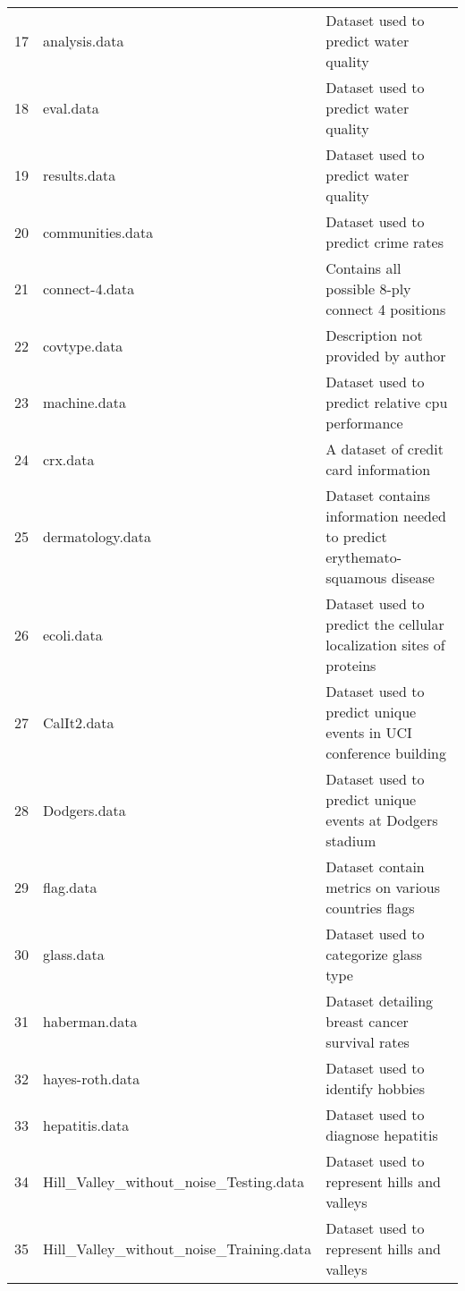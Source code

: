 \begin{table}
{\begin{tabular}{lll}
17 &                            analysis.data &  Dataset used to predict water quality\\
18 &                                eval.data &  Dataset used to predict water quality\\
19 &                             results.data &  Dataset used to predict water quality\\
20 &                         communities.data &  Dataset used to predict crime rates\\
21 &                           connect-4.data &  Contains all possible 8-ply connect 4 positions\\
22 &                             covtype.data &  Description not provided by author\\
23 &                             machine.data &  Dataset used to predict relative cpu performance\\
24 &                                 crx.data &  A dataset of credit card information\\
25 &                         dermatology.data &  Dataset contains information needed to predict erythemato-squamous disease\\
26 &                               ecoli.data &  Dataset used to predict the cellular localization sites of proteins\\
27 &                              CalIt2.data &  Dataset used to predict unique events in UCI conference building\\
28 &                             Dodgers.data &  Dataset used to predict unique events at Dodgers stadium\\
29 &                                flag.data &  Dataset contain metrics on various countries flags\\
30 &                               glass.data &  Dataset used to categorize glass type\\
31 &                            haberman.data &  Dataset detailing breast cancer survival rates\\
32 &                          hayes-roth.data &  Dataset used to identify hobbies\\
33 &                           hepatitis.data &  Dataset used to diagnose hepatitis\\
34 &   Hill\_Valley\_without\_noise\_Testing.data & Dataset used to represent hills and valleys\\
35 &  Hill\_Valley\_without\_noise\_Training.data & Dataset used to represent hills and valleys\\

\end{tabular}}
\end{table}

